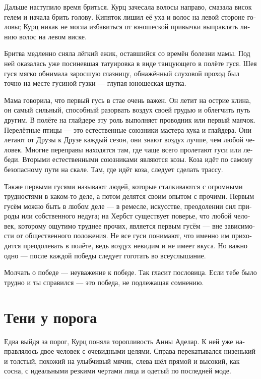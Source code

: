 \documentclass[a4paper,12pt,fleqn]{book}\usepackage{polyglossia}\setdefaultlanguage[babelshorthands=true]{russian}\setotherlanguage{english}\defaultfontfeatures{Ligatures=TeX,Mapping=tex-text}\usepackage{xcolor}\newcommand{\ml}[3]{#2}
\begin{document}
Дальше наступило время бриться.
Курц зачесала волосы направо, смазала висок гелем и начала брить голову.
Кипяток лишил её уха и волос на левой стороне головы;
Курц никак не могла избавиться от юношеской привычки выправлять линию волос на левом виске.

Бритва медленно сняла лёгкий ежик, оставшийся со времён болезни мамы.
Под ней оказалась уже посиневшая татуировка в виде танцующего в полёте гуся.
Шея гуся мягко обнимала заросшую глазницу, обнажённый слуховой проход был точно на месте гусиной гузки --- глупая юношеская шутка.

Мама говорила, что первый гусь в стае очень важен.
Он летит на острие клина, он самый сильный, способный разорвать воздух своей грудью и облегчить путь другим.
В полёте на глайдере эту роль выполняет проводник или первый маячок.
Перелётные птицы --- это естественные союзники мастера хука и глайдера.
Они летают от Друзы к Друзе каждый сезон, они знают воздух лучше, чем любой человек.
Многие переправы находятся там, где чаще всего пролетают гуси или лебеди.
Вторыми естественными союзниками являются козы.
Коза идёт по самому безопасному пути на скале.
Там, где идёт коза, следует сделать трассу.

Также первыми гусями называют людей, которые сталкиваются с огромными трудностями в каком-то деле, а потом делятся своим опытом с прочими.
Первым гусём можно быть в любом деле --- в ремесле, искусстве, преодолении сил природы или собственного недуга;
на Хербст существует поверье, что любой человек, которому ощутимо труднее прочих, является первым гусём --- вне зависимости от общественного положения.
Не все гуси понимают, что именно им приходится преодолевать в полёте, ведь воздух невидим и не имеет вкуса.
Но важно одно --- после каждой победы следует гоготать во всеуслышание.

Молчать о победе --- неуважение к победе.
Так гласит пословица.
Если тебе было трудно и ты справился --- это победа, не подлежащая сомнению.

\section{Тени у порога}

Едва выйдя за порог, Курц поняла торопливость Анны Аделар.
К ней уже направлялось двое человек с очевидными целями.
Справа перекатывался низенький и толстый, похожий на улыбчивый мячик, слева шёл прямой и высокий, как сосна, с идеальными резкими чертами лица и одетый по последней моде.
\end{document}
